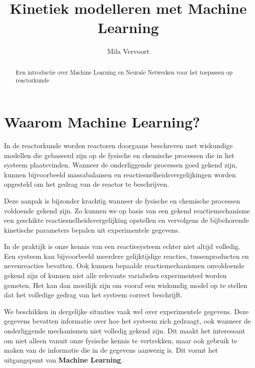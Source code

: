 \documentclass{ximera}
\title{Kinetiek modelleren met Machine Learning}
\author{Mila Vervoort}
\begin{document}
\begin{abstract}
    Een introductie over Machine Learning en Neurale Netwerken voor het toepassen op reactorkunde
\end{abstract}
\maketitle
\label{xim:Machine Learning}

\section*{Waarom Machine Learning?}

In de reactorkunde worden reactoren doorgaans beschreven met wiskundige modellen die gebaseerd zijn op de fysische en chemische processen die in het systeem plaatsvinden. Wanneer de onderliggende processen goed gekend zijn, kunnen bijvoorbeeld massabalansen en reactiesnelheidsvergelijkingen worden opgesteld om het gedrag van de reactor te beschrijven.

Deze aanpak is bijzonder krachtig wanneer de fysische en chemische processen voldoende gekend zijn. Zo kunnen we op basis van een gekend reactiemechanisme een geschikte reactiesnelheidsvergelijking opstellen en vervolgens de bijbehorende kinetische parameters bepalen uit experimentele gegevens.

In de praktijk is onze kennis van een reactiesysteem echter niet altijd volledig. Een systeem kan bijvoorbeeld meerdere gelijktijdige reacties, tussenproducten en nevenreacties bevatten. Ook kunnen bepaalde reactiemechanismen onvoldoende gekend zijn of kunnen niet alle relevante variabelen experimenteel worden gemeten. Het kan dan moeilijk zijn om vooraf een wiskundig model op te stellen dat het volledige gedrag van het systeem correct beschrijft.

We beschikken in dergelijke situaties vaak wel over experimentele gegevens. Deze gegevens bevatten informatie over hoe het systeem zich gedraagt, ook wanneer de onderliggende mechanismen niet volledig gekend zijn. Dit maakt het interessant om niet alleen vanuit onze fysische kennis te vertrekken, maar ook gebruik te maken van de informatie die in de gegevens aanwezig is. Dit vormt het uitgangspunt van \textbf{Machine Learning}. 
\end{document}
